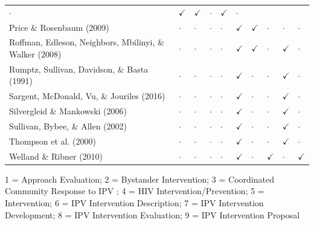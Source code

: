 \documentclass[11pt,]{tufte-book}
\begin{document}
\begin{longtable}[]{@{}llllllllll@{}}
\(\cdot\) & \(\checkmark\) & \(\checkmark\) & \(\cdot\) & \(\checkmark\)
& \(\cdot\)\tabularnewline
Price \& Rosenbaum (2009) & \(\cdot\) & \(\cdot\) & \(\cdot\) &
\(\cdot\) & \(\checkmark\) & \(\checkmark\) & \(\cdot\) & \(\cdot\) &
\(\cdot\)\tabularnewline
Roffman, Edleson, Neighbors, Mbilinyi, \& Walker (2008) & \(\cdot\) &
\(\cdot\) & \(\cdot\) & \(\cdot\) & \(\checkmark\) & \(\checkmark\) &
\(\cdot\) & \(\checkmark\) & \(\cdot\)\tabularnewline
Rumptz, Sullivan, Davidson, \& Basta (1991) & \(\cdot\) & \(\cdot\) &
\(\cdot\) & \(\cdot\) & \(\checkmark\) & \(\cdot\) & \(\cdot\) &
\(\checkmark\) & \(\cdot\)\tabularnewline
Sargent, McDonald, Vu, \& Jouriles (2016) & \(\cdot\) & \(\cdot\) &
\(\cdot\) & \(\cdot\) & \(\checkmark\) & \(\cdot\) & \(\cdot\) &
\(\checkmark\) & \(\cdot\)\tabularnewline
Silvergleid \& Mankowski (2006) & \(\cdot\) & \(\cdot\) & \(\cdot\) &
\(\cdot\) & \(\checkmark\) & \(\cdot\) & \(\cdot\) & \(\checkmark\) &
\(\cdot\)\tabularnewline
Sullivan, Bybee, \& Allen (2002) & \(\cdot\) & \(\cdot\) & \(\cdot\) &
\(\cdot\) & \(\checkmark\) & \(\cdot\) & \(\cdot\) & \(\checkmark\) &
\(\cdot\)\tabularnewline
Thompson et al. (2000) & \(\cdot\) & \(\cdot\) & \(\cdot\) & \(\cdot\) &
\(\checkmark\) & \(\cdot\) & \(\cdot\) & \(\checkmark\) &
\(\cdot\)\tabularnewline
Welland \& Ribner (2010) & \(\cdot\) & \(\cdot\) & \(\cdot\) & \(\cdot\)
& \(\checkmark\) & \(\cdot\) & \(\checkmark\) & \(\cdot\) &
\(\checkmark\)\tabularnewline
\bottomrule
\end{longtable}

1 = Approach Evaluation; 2 = Bystander Intervention; 3 = Coordinated
Community Response to IPV ; 4 = HIV Intervention/Prevention; 5 =
Intervention; 6 = IPV Intervention Description; 7 = IPV Intervention
Development; 8 = IPV Intervention Evaluation; 9 = IPV Intervention
Proposal
\end{document}
